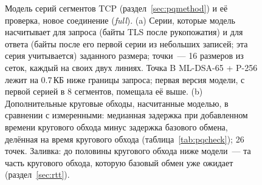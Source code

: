 \documentclass[conference,a4paper]{IEEEtran}
\newcommand{\newgreen}[1]{{\color{green!50!black}#1}}
\newcommand{\newviolet}[1]{{\color{violet}#1}}
\begin{document}
{\begin{figure}[!tb]
\caption{\newviolet{Модель серий сегментов TCP (раздел~\ref{sec:pqmethod}) и её проверка, новое
соединение (\emph{full}). (a) Серии, которые модель насчитывает для запроса (байты TLS после
рукопожатия) и для ответа (байты после его первой серии из небольших записей; эта серия
учитывается) заданного размера; точки~--- 16 размеров из сеток, каждый на своих двух линиях. Точка B
ML-DSA-65 + P-256 лежит на 0.7\,КБ ниже границы запроса; первая версия модели,
с первой серией в 8 сегментов, помещала её выше. (b) Дополнительные круговые обходы, насчитанные моделью,
в сравнении с измеренными: \newgreen{медианная задержка при добавленном времени кругового обхода минус задержка
базового обмена, делённая на время кругового обхода} (таблица~\ref{tab:pqcheck}); 26 точек.
Заливка: до половины кругового обхода ниже модели~--- та часть кругового обхода, которую базовый обмен уже
ожидает (раздел~\ref{sec:rtt}).}}
\label{fig:flights}
\end{figure}

}
\end{document}
